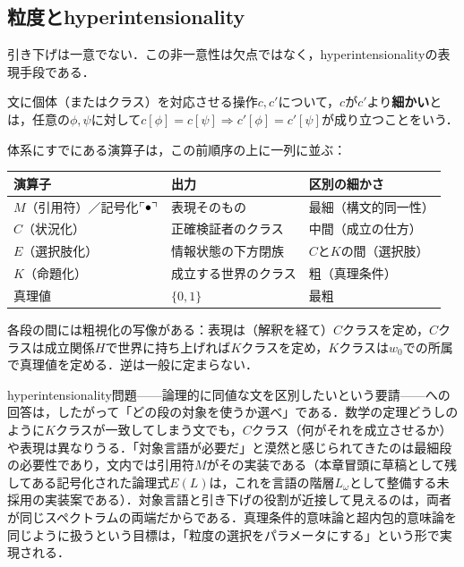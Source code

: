 \documentclass[../../main-detail.tex]{subfiles}
\begin{document}
\subsection{粒度とhyperintensionality}
引き下げは一意でない．この非一意性は欠点ではなく，hyperintensionalityの表現手段である．
\begin{definition}[粒度]
    文に個体（またはクラス）を対応させる操作$c, c'$について，$c$が$c'$より\textbf{細かい}とは，任意の$\phi, \psi$に対して$c[\phi] = c[\psi] \Rightarrow c'[\phi] = c'[\psi]$が成り立つことをいう．
\end{definition}
体系にすでにある演算子は，この前順序の上に一列に並ぶ：
\begin{center}
\begin{tabular}{lll}
    \toprule
    演算子 & 出力 & 区別の細かさ \\
    \midrule
    $M$（引用符）／記号化$\ulcorner \bullet \urcorner$ & 表現そのもの & 最細（構文的同一性）\\
    $C$（状況化） & 正確検証者のクラス & 中間（成立の仕方）\\
    $E$（選択肢化） & 情報状態の下方閉族 & $C$と$K$の間（選択肢）\\
    $K$（命題化） & 成立する世界のクラス & 粗（真理条件）\\
    真理値 & $\{0,1\}$ & 最粗 \\
    \bottomrule
\end{tabular}
\end{center}
各段の間には粗視化の写像がある：表現は（解釈を経て）$C$クラスを定め，$C$クラスは成立関係$H$で世界に持ち上げれば$K$クラスを定め，$K$クラスは$w_0$での所属で真理値を定める．逆は一般に定まらない．

hyperintensionality問題——論理的に同値な文を区別したいという要請——への回答は，したがって「どの段の対象を使うか選べ」である．数学の定理どうしのように$K$クラスが一致してしまう文でも，$C$クラス（何がそれを成立させるか）や表現は異なりうる．「対象言語が必要だ」と漠然と感じられてきたのは最細段の必要性であり，文内では引用符$M$がその実装である（本章冒頭に草稿として残してある記号化された論理式$E(L)$は，これを言語の階層$L_\omega$として整備する未採用の実装案である）．対象言語と引き下げの役割が近接して見えるのは，両者が同じスペクトラムの両端だからである．真理条件的意味論と超内包的意味論を同じように扱うという目標は，「粒度の選択をパラメータにする」という形で実現される．
\end{document}
